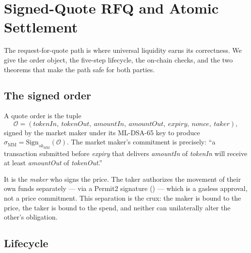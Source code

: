 \section{Signed-Quote RFQ and Atomic Settlement}
\label{sec:rfq}

The request-for-quote path is where universal liquidity earns its
correctness. We give the order object, the five-step lifecycle, the
on-chain checks, and the two theorems that make the path safe for both
parties.

\subsection{The signed order}

\begin{definition}
\label{def:order}
A quote order is the tuple
\[
\mathcal{O} = (\mathit{tokenIn},\ \mathit{tokenOut},\
\mathit{amountIn},\ \mathit{amountOut},\ \mathit{expiry},\
\mathit{nonce},\ \mathit{taker}),
\]
signed by the market maker under its ML-DSA-65 key to produce
$\sigma_{\mathrm{MM}} = \mathrm{Sign}_{sk_{\mathrm{MM}}}(\mathcal{O})$.
The market maker's commitment is precisely: ``a transaction submitted
before \emph{expiry} that delivers \emph{amountIn} of \emph{tokenIn}
will receive at least \emph{amountOut} of \emph{tokenOut}.''
\end{definition}

It is the \emph{maker} who signs the price. The taker authorizes the
movement of their own funds separately --- via a Permit2 signature
(\cite{permit2}) --- which is a gasless approval, not a price commitment.
This separation is the crux: the maker is bound to the price, the taker
is bound to the spend, and neither can unilaterally alter the other's
obligation.

\subsection{Lifecycle}

